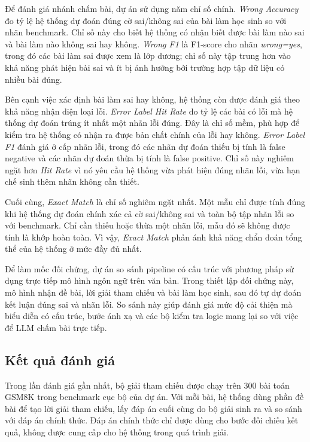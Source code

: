 \documentclass[12pt,a4paper]{article}
\begin{document}
Để đánh giá nhánh chấm bài, dự án sử dụng năm chỉ số chính. \textit{Wrong Accuracy} đo tỷ lệ hệ thống dự đoán đúng cờ sai/không sai của bài làm học sinh so với nhãn benchmark. Chỉ số này cho biết hệ thống có nhận biết được bài làm nào sai và bài làm nào không sai hay không. \textit{Wrong F1} là F1-score cho nhãn \textit{wrong=yes}, trong đó các bài làm sai được xem là lớp dương; chỉ số này tập trung hơn vào khả năng phát hiện bài sai và ít bị ảnh hưởng bởi trường hợp tập dữ liệu có nhiều bài đúng.

Bên cạnh việc xác định bài làm sai hay không, hệ thống còn được đánh giá theo khả năng nhận diện loại lỗi. \textit{Error Label Hit Rate} đo tỷ lệ các bài có lỗi mà hệ thống dự đoán trúng ít nhất một nhãn lỗi đúng. Đây là chỉ số mềm, phù hợp để kiểm tra hệ thống có nhận ra được bản chất chính của lỗi hay không. \textit{Error Label F1} đánh giá ở cấp nhãn lỗi, trong đó các nhãn dự đoán thiếu bị tính là false negative và các nhãn dự đoán thừa bị tính là false positive. Chỉ số này nghiêm ngặt hơn \textit{Hit Rate} vì nó yêu cầu hệ thống vừa phát hiện đúng nhãn lỗi, vừa hạn chế sinh thêm nhãn không cần thiết.

Cuối cùng, \textit{Exact Match} là chỉ số nghiêm ngặt nhất. Một mẫu chỉ được tính đúng khi hệ thống dự đoán chính xác cả cờ sai/không sai và toàn bộ tập nhãn lỗi so với benchmark. Chỉ cần thiếu hoặc thừa một nhãn lỗi, mẫu đó sẽ không được tính là khớp hoàn toàn. Vì vậy, \textit{Exact Match} phản ánh khả năng chẩn đoán tổng thể của hệ thống ở mức đầy đủ nhất.

Để làm mốc đối chứng, dự án so sánh pipeline có cấu trúc với phương pháp sử dụng trực tiếp mô hình ngôn ngữ trên văn bản. Trong thiết lập đối chứng này, mô hình nhận đề bài, lời giải tham chiếu và bài làm học sinh, sau đó tự dự đoán kết luận đúng sai và nhãn lỗi. So sánh này giúp đánh giá mức độ cải thiện mà biểu diễn có cấu trúc, bước ánh xạ và các bộ kiểm tra logic mang lại so với việc để LLM chấm bài trực tiếp.


\subsection{Kết quả đánh giá}

Trong lần đánh giá gần nhất, bộ giải tham chiếu được chạy trên 300 bài toán
GSM8K trong benchmark cục bộ của dự án. Với mỗi bài, hệ thống dùng phần đề bài
để tạo lời giải tham chiếu, lấy đáp án cuối cùng do bộ giải sinh ra và so sánh
với đáp án chính thức. Đáp án chính thức chỉ được dùng cho bước đối chiếu kết
quả, không được cung cấp cho hệ thống trong quá trình giải.
\end{document}
